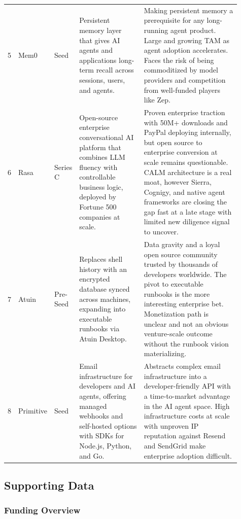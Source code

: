 \documentclass[11pt, letterpaper]{article}
\begin{document}
\begin{longtable}{@{} p{0.04\linewidth} p{0.10\linewidth} p{0.07\linewidth}
                      p{0.28\linewidth} p{0.42\linewidth} @{}}
  5 & Mem0 & Seed &
  Persistent memory layer that gives AI agents and applications long-term recall
  across sessions, users, and agents. &
  Making persistent memory a prerequisite for any long-running agent product.
  Large and growing TAM as agent adoption accelerates. Faces the risk of being
  commoditized by model providers and competition from well-funded players
  like Zep. \\[0.5em]

  6 & Rasa & Series C &
  Open-source enterprise conversational AI platform that combines LLM fluency
  with controllable business logic, deployed by Fortune 500 companies at scale. &
  Proven enterprise traction with 50M+ downloads and PayPal deploying
  internally, but open source to enterprise conversion at scale remains
  questionable. CALM architecture is a real moat, however Sierra, Cognigy, and
  native agent frameworks are closing the gap fast at a late stage with limited
  new diligence signal to uncover. \\[0.5em]

  7 & Atuin & Pre-Seed &
  Replaces shell history with an encrypted database synced across machines,
  expanding into executable runbooks via Atuin Desktop. &
  Data gravity and a loyal open source community trusted by thousands of
  developers worldwide. The pivot to executable runbooks is the more interesting
  enterprise bet. Monetization path is unclear and not an obvious venture-scale
  outcome without the runbook vision materializing. \\[0.5em]

  8 & Primitive & Seed &
  Email infrastructure for developers and AI agents, offering managed webhooks
  and self-hosted options with SDKs for Node.js, Python, and Go. &
  Abstracts complex email infrastructure into a developer-friendly API with a
  time-to-market advantage in the AI agent space. High infrastructure costs at
  scale with unproven IP reputation against Resend and SendGrid make enterprise
  adoption difficult. \\

\end{longtable}

\subsection{Supporting Data}

\subsubsection{Funding Overview}
\end{document}
